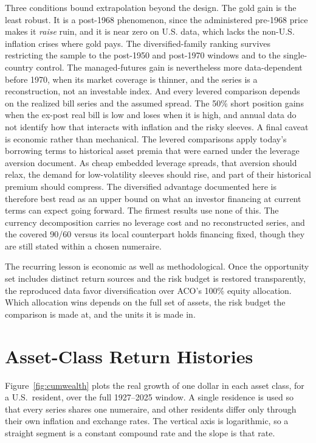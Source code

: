 \documentclass[11pt]{article}
\begin{document}
Three conditions bound extrapolation beyond the design. The gold gain is the
least robust. It is a post-1968 phenomenon, since the administered pre-1968
price makes it \emph{raise} ruin, and it is near zero on U.S. data, which lacks
the non-U.S. inflation crises where gold pays. The diversified-family ranking
survives restricting the sample to the post-1950 and post-1970 windows and to
the single-country control. The managed-futures gain is nevertheless more
data-dependent before 1970, when its market coverage is thinner, and the series
is a reconstruction, not an investable index. And every levered
comparison depends on the realized bill series and the assumed spread. The 50\%
short position gains when the ex-post real bill is low and loses when it is
high, and annual data do not identify how that interacts with inflation and the
risky sleeves. A final caveat is economic rather than mechanical. The levered
comparisons apply today's borrowing terms to historical asset premia that were
earned under the leverage aversion \citet{FrazziniPedersen2014} document. As
cheap embedded leverage spreads, that aversion should relax, the demand for
low-volatility sleeves should rise, and part of their historical premium should
compress. The diversified advantage documented here is therefore best read as an
upper bound on what an investor financing at current terms can expect going
forward. The firmest results use none of this. The currency decomposition
carries no leverage cost and no reconstructed series, and the covered 90/60
versus its local counterpart holds financing fixed, though they are still stated
within a chosen numeraire.

The recurring lesson is economic as well as methodological. Once the opportunity
set includes distinct return sources and the risk budget is restored
transparently, the reproduced data favor diversification over ACO's 100\%
equity allocation. Which allocation wins depends on the full set of assets, the
risk budget the comparison is made at, and the units it is made in.

\newpage
\printbibliography

\appendix
\newpage
\section{Asset-Class Return Histories}
\label{app:returns}

Figure~\ref{fig:cumwealth} plots the real growth of one dollar in each asset
class, for a U.S.\ resident, over the full 1927--2025 window. A single residence
is used so that every series shares one numeraire, and other residents differ
only through their own inflation and exchange rates. The vertical axis is
logarithmic, so a straight segment is a constant compound rate and the slope is
that rate.
\end{document}
